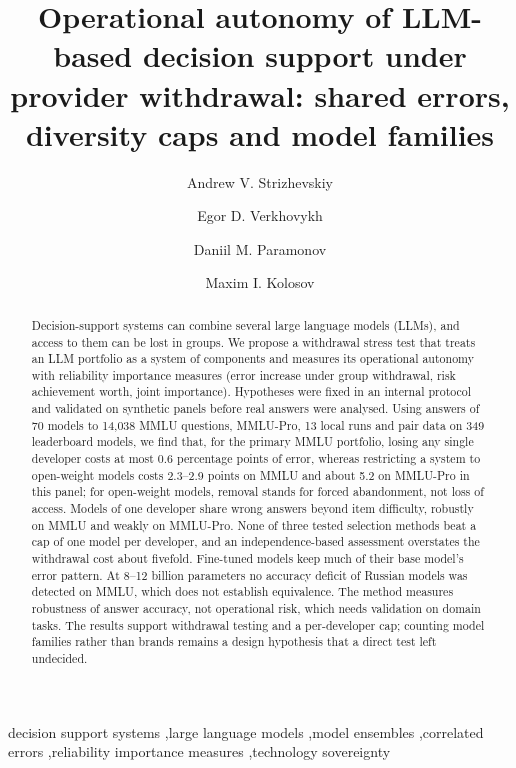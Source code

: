 \documentclass[preprint,12pt,authoryear]{elsarticle}
\begin{document}
\begin{frontmatter}

\title{Operational autonomy of LLM-based decision support under provider withdrawal: shared errors, diversity caps and model families}

\author[bmstu]{Andrew V. Strizhevskiy}
\author[bmstu]{Egor D. Verkhovykh}
\author[bmstu]{Daniil M. Paramonov}
\author[bmstu]{Maxim I. Kolosov}

\begin{abstract}
Decision-support systems can combine several large language models (LLMs), and access to them can be lost in groups. We propose a withdrawal stress test that treats an LLM portfolio as a system of components and measures its operational autonomy with reliability importance measures (error increase under group withdrawal, risk achievement worth, joint importance). Hypotheses were fixed in an internal protocol and validated on synthetic panels before real answers were analysed. Using answers of 70 models to 14,038 MMLU questions, MMLU-Pro, 13 local runs and pair data on 349 leaderboard models, we find that, for the primary MMLU portfolio, losing any single developer costs at most 0.6 percentage points of error, whereas restricting a system to open-weight models costs 2.3--2.9 points on MMLU and about 5.2 on MMLU-Pro in this panel; for open-weight models, removal stands for forced abandonment, not loss of access. Models of one developer share wrong answers beyond item difficulty, robustly on MMLU and weakly on MMLU-Pro. None of three tested selection methods beat a cap of one model per developer, and an independence-based assessment overstates the withdrawal cost about fivefold. Fine-tuned models keep much of their base model's error pattern. At 8--12 billion parameters no accuracy deficit of Russian models was detected on MMLU, which does not establish equivalence. The method measures robustness of answer accuracy, not operational risk, which needs validation on domain tasks. The results support withdrawal testing and a per-developer cap; counting model families rather than brands remains a design hypothesis that a direct test left undecided.
\end{abstract}

\begin{keyword}
decision support systems \sep large language models \sep model ensembles \sep correlated errors \sep reliability importance measures \sep technology sovereignty
\end{keyword}

\end{frontmatter}
\end{document}
